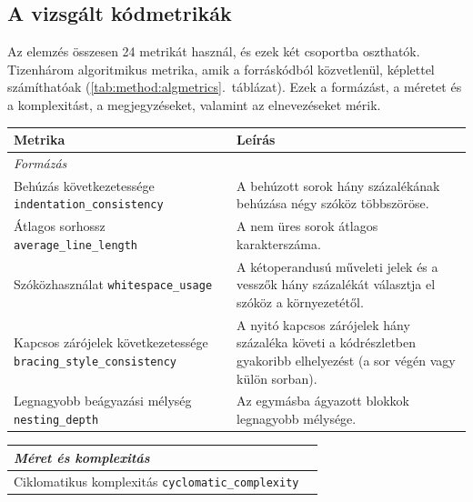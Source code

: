 \documentclass[
]{elteikthesis}[2024/04/26]
\begin{document}
\subsection{A vizsgált kódmetrikák}

Az elemzés összesen 24 metrikát használ, és ezek két csoportba oszthatók.
Tizenhárom algoritmikus metrika, amik a forráskódból közvetlenül, képlettel
számíthatóak (\ref{tab:method:algmetrics}.~táblázat). Ezek a formázást, a
méretet és a komplexitást, a megjegyzéseket, valamint az elnevezéseket mérik.

\begin{table}[htb]
	\centering
	\small
	\let\oldtexttt\texttt
	\renewcommand{\texttt}[1]{\oldtexttt{\footnotesize #1}}
	\begin{tabular}{ | p{5.6cm} | p{7.8cm} | }
		\hline
		\textbf{Metrika} & \textbf{Leírás} \\
		\hline \hline
		\multicolumn{2}{|l|}{\textit{Formázás}} \\
		\hline
		Behúzás következetessége \newline \texttt{indentation\_consistency} &
		A behúzott sorok hány százalékának behúzása négy szóköz többszöröse. \\
		\hline
		Átlagos sorhossz \newline \texttt{average\_line\_length} &
		A nem üres sorok átlagos karakterszáma. \\
		\hline
		Szóközhasználat \newline \texttt{whitespace\_usage} &
		A kétoperandusú műveleti jelek és a vesszők hány százalékát választja el
		szóköz a környezetétől. \\
		\hline
		Kapcsos zárójelek következetessége \newline \texttt{bracing\_style\_consistency} &
		A nyitó kapcsos zárójelek hány százaléka követi a kódrészletben gyakoribb
		elhelyezést (a sor végén vagy külön sorban). \\
		\hline
		Legnagyobb beágyazási mélység \newline \texttt{nesting\_depth} &
		Az egymásba ágyazott blokkok legnagyobb mélysége. \\
		\hline
	\end{tabular}\par\medskip
	\begin{tabular}{ | p{5.6cm} | p{7.8cm} | }
		\hline
		\multicolumn{2}{|l|}{\textit{Méret és komplexitás}} \\
		\hline
		Ciklomatikus komplexitás \newline \texttt{cyclomatic\_complexity} &

\end{tabular}
\end{table}
\end{document}
